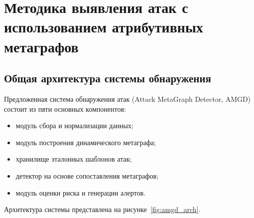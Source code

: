 
\chapter{Методика выявления атак с использованием атрибутивных метаграфов}

\section{Общая архитектура системы обнаружения}

Предложенная система обнаружения атак (Attack MetaGraph Detector, AMGD) состоит из пяти основных компонентов:
\begin{itemize}
    \item модуль сбора и нормализации данных;
    \item модуль построения динамического метаграфа;
    \item хранилище эталонных шаблонов атак;
    \item детектор на основе сопоставления метаграфов;
    \item модуль оценки риска и генерации алертов.
\end{itemize}

Архитектура системы представлена на рисунке~\ref{fig:amgd_arch}.

